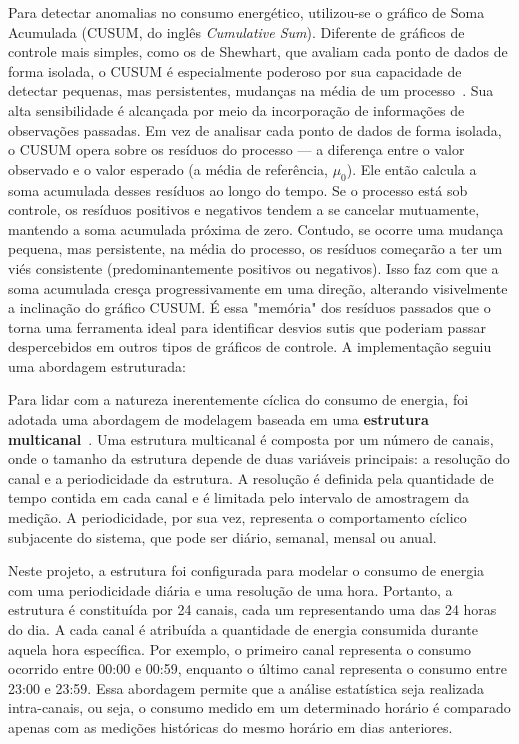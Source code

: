 Para detectar anomalias no consumo energético, utilizou-se o gráfico de Soma Acumulada (CUSUM, do inglês \textit{Cumulative Sum}). Diferente de gráficos de controle mais simples, como os de Shewhart, que avaliam cada ponto de dados de forma isolada, o CUSUM é especialmente poderoso por sua capacidade de detectar pequenas, mas persistentes, mudanças na média de um processo~\cite{Montgomery2020SQC}. Sua alta sensibilidade é alcançada por meio da incorporação de informações de observações passadas. Em vez de analisar cada ponto de dados de forma isolada, o CUSUM opera sobre os resíduos do processo — a diferença entre o valor observado e o valor esperado (a média de referência, $\mu_0$). Ele então calcula a soma acumulada desses resíduos ao longo do tempo. Se o processo está sob controle, os resíduos positivos e negativos tendem a se cancelar mutuamente, mantendo a soma acumulada próxima de zero. Contudo, se ocorre uma mudança pequena, mas persistente, na média do processo, os resíduos começarão a ter um viés consistente (predominantemente positivos ou negativos). Isso faz com que a soma acumulada cresça progressivamente em uma direção, alterando visivelmente a inclinação do gráfico CUSUM. É essa "memória" dos resíduos passados que o torna uma ferramenta ideal para identificar desvios sutis que poderiam passar despercebidos em outros tipos de gráficos de controle. A implementação seguiu uma abordagem estruturada:

Para lidar com a natureza inerentemente cíclica do consumo de energia, foi adotada uma abordagem de modelagem baseada em uma \textbf{estrutura multicanal}~\cite{Braga2010TeseValidacao}. Uma estrutura multicanal é composta por um número de canais, onde o tamanho da estrutura depende de duas variáveis principais: a resolução do canal e a periodicidade da estrutura. A resolução é definida pela quantidade de tempo contida em cada canal e é limitada pelo intervalo de amostragem da medição. A periodicidade, por sua vez, representa o comportamento cíclico subjacente do sistema, que pode ser diário, semanal, mensal ou anual.

Neste projeto, a estrutura foi configurada para modelar o consumo de energia com uma periodicidade diária e uma resolução de uma hora. Portanto, a estrutura é constituída por 24 canais, cada um representando uma das 24 horas do dia. A cada canal é atribuída a quantidade de energia consumida durante aquela hora específica. Por exemplo, o primeiro canal representa o consumo ocorrido entre 00:00 e 00:59, enquanto o último canal representa o consumo entre 23:00 e 23:59. Essa abordagem permite que a análise estatística seja realizada intra-canais, ou seja, o consumo medido em um determinado horário é comparado apenas com as medições históricas do mesmo horário em dias anteriores.

